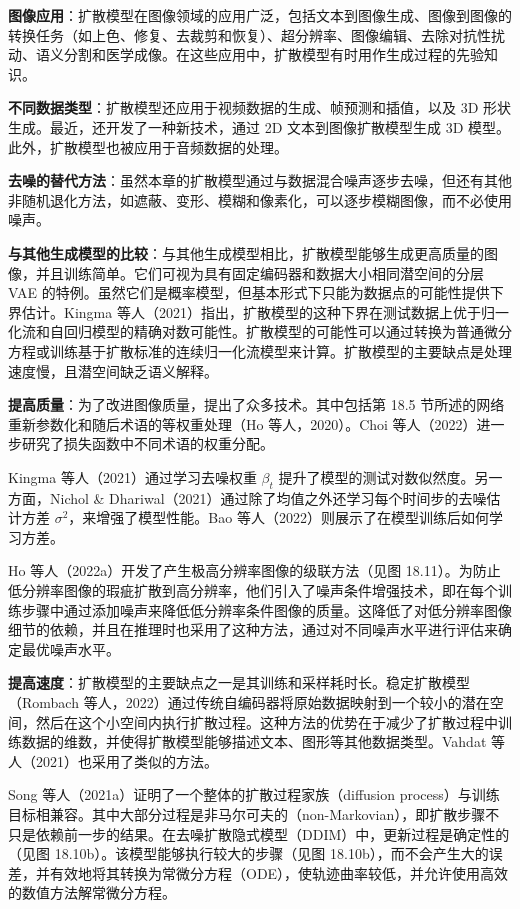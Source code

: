 \textbf{图像应用}：扩散模型在图像领域的应用广泛，包括文本到图像生成、图像到图像的转换任务（如上色、修复、去裁剪和恢复）、超分辨率、图像编辑、去除对抗性扰动、语义分割和医学成像。在这些应用中，扩散模型有时用作生成过程的先验知识。

\textbf{不同数据类型}：扩散模型还应用于视频数据的生成、帧预测和插值，以及 3D 形状生成。最近，还开发了一种新技术，通过 2D 文本到图像扩散模型生成 3D 模型。此外，扩散模型也被应用于音频数据的处理。

\textbf{去噪的替代方法}：虽然本章的扩散模型通过与数据混合噪声逐步去噪，但还有其他非随机退化方法，如遮蔽、变形、模糊和像素化，可以逐步模糊图像，而不必使用噪声。

\textbf{与其他生成模型的比较}：与其他生成模型相比，扩散模型能够生成更高质量的图像，并且训练简单。它们可视为具有固定编码器和数据大小相同潜空间的分层 VAE 的特例。虽然它们是概率模型，但基本形式下只能为数据点的可能性提供下界估计。Kingma 等人（2021）指出，扩散模型的这种下界在测试数据上优于归一化流和自回归模型的精确对数可能性。扩散模型的可能性可以通过转换为普通微分方程或训练基于扩散标准的连续归一化流模型来计算。扩散模型的主要缺点是处理速度慢，且潜空间缺乏语义解释。

\textbf{提高质量}：为了改进图像质量，提出了众多技术。其中包括第 18.5 节所述的网络重新参数化和随后术语的等权重处理（Ho 等人，2020）。Choi 等人（2022）进一步研究了损失函数中不同术语的权重分配。

Kingma 等人（2021）通过学习去噪权重 \(\beta_t\) 提升了模型的测试对数似然度。另一方面，Nichol & Dhariwal（2021）通过除了均值之外还学习每个时间步的去噪估计方差 \(\sigma^2\)，来增强了模型性能。Bao 等人（2022）则展示了在模型训练后如何学习方差。

Ho 等人（2022a）开发了产生极高分辨率图像的级联方法（见图 18.11）。为防止低分辨率图像的瑕疵扩散到高分辨率，他们引入了噪声条件增强技术，即在每个训练步骤中通过添加噪声来降低低分辨率条件图像的质量。这降低了对低分辨率图像细节的依赖，并且在推理时也采用了这种方法，通过对不同噪声水平进行评估来确定最优噪声水平。

\textbf{提高速度}：扩散模型的主要缺点之一是其训练和采样耗时长。稳定扩散模型（Rombach 等人，2022）通过传统自编码器将原始数据映射到一个较小的潜在空间，然后在这个小空间内执行扩散过程。这种方法的优势在于减少了扩散过程中训练数据的维数，并使得扩散模型能够描述文本、图形等其他数据类型。Vahdat 等人（2021）也采用了类似的方法。

Song 等人（2021a）证明了一个整体的扩散过程家族（diffusion process）与训练目标相兼容。其中大部分过程是非马尔可夫的（non-Markovian），即扩散步骤不只是依赖前一步的结果。在去噪扩散隐式模型（DDIM）中，更新过程是确定性的（见图 18.10b）。该模型能够执行较大的步骤（见图 18.10b），而不会产生大的误差，并有效地将其转换为常微分方程（ODE），使轨迹曲率较低，并允许使用高效的数值方法解常微分方程。

